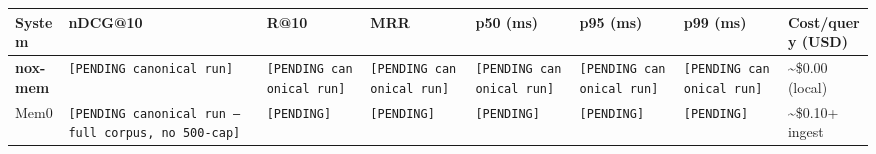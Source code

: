 \documentclass[
]{article}
\newcounter{none} %
\begin{document}
{\def\LTcaptype{none} %
\begin{longtable}[]{@{}
  >{\raggedright\arraybackslash}p{}
  >{\raggedleft\arraybackslash}p{}
  >{\raggedleft\arraybackslash}p{}
  >{\raggedleft\arraybackslash}p{}
  >{\raggedleft\arraybackslash}p{}
  >{\raggedleft\arraybackslash}p{}
  >{\raggedleft\arraybackslash}p{}
  >{\raggedleft\arraybackslash}p{}@{}}
\toprule\noalign{}
\begin{minipage}[b]{\linewidth}\raggedright
System
\end{minipage} & \begin{minipage}[b]{\linewidth}\raggedleft
nDCG@10
\end{minipage} & \begin{minipage}[b]{\linewidth}\raggedleft
R@10
\end{minipage} & \begin{minipage}[b]{\linewidth}\raggedleft
MRR
\end{minipage} & \begin{minipage}[b]{\linewidth}\raggedleft
p50 (ms)
\end{minipage} & \begin{minipage}[b]{\linewidth}\raggedleft
p95 (ms)
\end{minipage} & \begin{minipage}[b]{\linewidth}\raggedleft
p99 (ms)
\end{minipage} & \begin{minipage}[b]{\linewidth}\raggedleft
Cost/query (USD)
\end{minipage} \\
\midrule\noalign{}
\endhead
\bottomrule\noalign{}
\endlastfoot
\textbf{nox-mem} & \texttt{{[}PENDING\ canonical\ run{]}} &
\texttt{{[}PENDING\ canonical\ run{]}} &
\texttt{{[}PENDING\ canonical\ run{]}} &
\texttt{{[}PENDING\ canonical\ run{]}} &
\texttt{{[}PENDING\ canonical\ run{]}} &
\texttt{{[}PENDING\ canonical\ run{]}} & \textasciitilde\$0.00
(local) \\
Mem0 &
\texttt{{[}PENDING\ canonical\ run\ —\ full\ corpus,\ no\ 500-cap{]}} &
\texttt{{[}PENDING{]}} & \texttt{{[}PENDING{]}} & \texttt{{[}PENDING{]}}
& \texttt{{[}PENDING{]}} & \texttt{{[}PENDING{]}} &
\textasciitilde\$0.10+ ingest \\

\end{longtable}}
\end{document}
